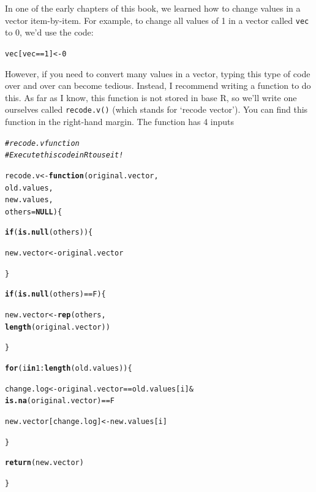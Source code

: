 \documentclass{tufte-book}\usepackage[]{graphicx}\usepackage[]{color}
\makeatletter
\newcommand{\hlnum}[1]{\textcolor[rgb]{0.686,0.059,0.569}{#1}}%
\newcommand{\hlcom}[1]{\textcolor[rgb]{0.678,0.584,0.686}{\textit{#1}}}%
\newcommand{\hlopt}[1]{\textcolor[rgb]{0,0,0}{#1}}%
\newcommand{\hlstd}[1]{\textcolor[rgb]{0.345,0.345,0.345}{#1}}%
\newcommand{\hlkwa}[1]{\textcolor[rgb]{0.161,0.373,0.58}{\textbf{#1}}}%
\newcommand{\hlkwb}[1]{\textcolor[rgb]{0.69,0.353,0.396}{#1}}%
\newcommand{\hlkwc}[1]{\textcolor[rgb]{0.333,0.667,0.333}{#1}}%
\newcommand{\hlkwd}[1]{\textcolor[rgb]{0.737,0.353,0.396}{\textbf{#1}}}%
\newenvironment{kframe}{%
 \def\at@end@of@kframe{}%
 \ifinner\ifhmode%
  \def\at@end@of@kframe{\end{minipage}}%
  \begin{minipage}{\columnwidth}%
 \fi\fi%
 \def\FrameCommand##1{\hskip\@totalleftmargin \hskip-\fboxsep
 \colorbox{shadecolor}{##1}\hskip-\fboxsep
     \hskip-\linewidth \hskip-\@totalleftmargin \hskip\columnwidth}%
 \MakeFramed {\advance\hsize-\width
   \@totalleftmargin\z@ \linewidth\hsize
   \@setminipage}}%
 {\par\unskip\endMakeFramed%
 \at@end@of@kframe}
\newenvironment{knitrout}{}{} %
\makeatother
\begin{document}
In one of the early chapters of this book, we learned how to change values in a vector item-by-item. For example, to change all values of 1 in a vector called \texttt{vec} to 0, we'd use the code:

\begin{knitrout}
\color{fgcolor}\begin{kframe}
\begin{alltt}
\hlstd{vec[vec} \hlopt{==} \hlnum{1}\hlstd{]} \hlkwb{<-} \hlnum{0}
\end{alltt}
\end{kframe}
\end{knitrout}

However, if you need to convert many values in a vector, typing this type of code over and over can become tedious. Instead, I recommend writing a function to do this. As far as I know, this function is not stored in base R, so we'll write one ourselves called \texttt{recode.v()} (which stands for `recode vector'). You can find this function in the right-hand margin. The function has 4 inputs

\begin{marginfigure}
\begin{knitrout}
\color{fgcolor}\begin{kframe}
\begin{alltt}
\hlcom{#recode.v function}
\hlcom{# Execute this code in R to use it!}

\hlstd{recode.v} \hlkwb{<-} \hlkwa{function}\hlstd{(}\hlkwc{original.vector}\hlstd{,}
                   \hlkwc{old.values}\hlstd{,}
                   \hlkwc{new.values}\hlstd{,}
                   \hlkwc{others} \hlstd{=} \hlkwa{NULL}\hlstd{) \{}

\hlkwa{if}\hlstd{(}\hlkwd{is.null}\hlstd{(others)) \{}

  \hlstd{new.vector} \hlkwb{<-} \hlstd{original.vector}

\hlstd{\}}

\hlkwa{if}\hlstd{(}\hlkwd{is.null}\hlstd{(others)} \hlopt{==} \hlstd{F) \{}

 \hlstd{new.vector} \hlkwb{<-} \hlkwd{rep}\hlstd{(others,}
                   \hlkwd{length}\hlstd{(original.vector))}

\hlstd{\}}

\hlkwa{for} \hlstd{(i} \hlkwa{in} \hlnum{1}\hlopt{:}\hlkwd{length}\hlstd{(old.values)) \{}

\hlstd{change.log} \hlkwb{<-} \hlstd{original.vector} \hlopt{==} \hlstd{old.values[i]} \hlopt{&}
              \hlkwd{is.na}\hlstd{(original.vector)} \hlopt{==} \hlstd{F}

\hlstd{new.vector[change.log]} \hlkwb{<-} \hlstd{new.values[i]}

\hlstd{\}}

\hlkwd{return}\hlstd{(new.vector)}

\hlstd{\}}
\end{alltt}
\end{kframe}
\end{knitrout}
\end{marginfigure}
\end{document}
